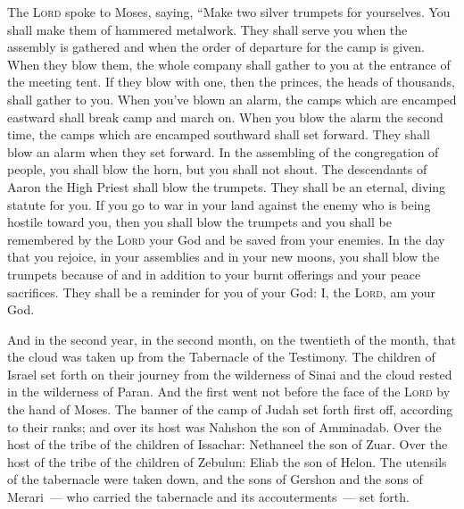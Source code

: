 
\begin{inparaenum}
     The \textsc{Lord} spoke to Moses, saying,%
     ``Make two silver trumpets for yourselves. You shall make them of hammered metalwork. They shall serve you when the assembly is gathered and when the order of departure for the camp is given.%
     When they blow them, the whole company shall gather to you at the entrance of the meeting tent.%
     If they blow with one, then the princes, the heads of thousands, shall gather to you.%
     When you've blown an alarm, the camps which are encamped eastward shall break camp and march on.%
     When you blow the alarm the second time, the camps which are encamped southward shall set forward. They shall blow an alarm when they set forward.%
     In the assembling of the congregation of people, you shall blow the horn, but you shall not shout.%
     The descendants of Aaron the High Priest shall blow the trumpets. They shall be an eternal, diving statute for you.%
     If you go to war in your land against the enemy who is being hostile toward you, then you shall blow the trumpets and you shall be remembered by the \textsc{Lord} your God and be saved from your enemies.%
     In the day that you rejoice, in your assemblies and in your new moons, you shall blow the trumpets because of and in addition to your burnt offerings and your peace sacrifices. They shall be a reminder for you of your God: I, the \textsc{Lord}, am your God.%
    
     And in the second year, in the second month, on the twentieth of the month, that the cloud was taken up from the Tabernacle of the Testimony.%
     The children of Israel set forth on their journey from the wilderness of Sinai and the cloud rested in the wilderness of Paran.%
     And the first went not before the face of the \textsc{Lord} by the hand of Moses.%
     The banner of the camp of Judah set forth first off, according to their ranks; and over its host was Nahshon the son of Amminadab.%
     Over the host of the tribe of the children of Issachar: Nethaneel the son of Zuar.%
     Over the host of the tribe of the children of Zebulun: Eliab the son of Helon.%
     The utensils of the tabernacle were taken down, and the sons of Gershon and the sons of Merari~--- who carried the tabernacle and its accouterments~--- set forth.%
    

\end{inparaenum}
